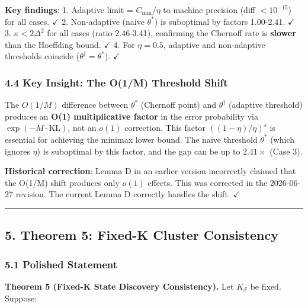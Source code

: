 \documentclass[
  12pt,
]{ctexart}
\begin{document}
\textbf{Key findings}: 1. Adaptive limit = \(C_{\min}/\eta\) to machine
precision (diff \(< 10^{-15}\)) for all cases. \(\checkmark\) 2.
Non-adaptive (naive \(\theta^*\)) is suboptimal by factors 1.00-2.41.
\(\checkmark\) 3. \(\kappa < 2\Delta^2\) for all cases (ratio
2.46-3.41), confirming the Chernoff rate is \textbf{slower} than the
Hoeffding bound. \(\checkmark\) 4. For \(\eta=0.5\), adaptive and
non-adaptive thresholds coincide (\(\theta^\dagger = \theta^*\)).
\(\checkmark\)

\subsubsection{4.4 Key Insight: The O(1/M) Threshold
Shift}\label{key-insight-the-o1m-threshold-shift}

The \(O(1/M)\) difference between \(\theta^*\) (Chernoff point) and
\(\theta^\dagger\) (adaptive threshold) produces an \textbf{O(1)
multiplicative factor} in the error probability via
\(\exp(-M\cdot\text{KL})\), not an \(o(1)\) correction. This factor
\(((1-\eta)/\eta)^s\) is essential for achieving the minimax lower
bound. The naive threshold \(\theta^*\) (which ignores \(\eta\)) is
suboptimal by this factor, and the gap can be up to \(2.41\times\) (Case
3).

\textbf{Historical correction}: Lemma D in an earlier version
incorrectly claimed that the O(1/M) shift produces only \(o(1)\)
effects. This was corrected in the 2026-06-27 revision. The current
Lemma D correctly handles the shift. \(\checkmark\)

\begin{center}\rule{0.5\linewidth}{0.5pt}\end{center}

\subsection{5. Theorem 5: Fixed-K Cluster
Consistency}\label{theorem-5-fixed-k-cluster-consistency}

\subsubsection{5.1 Polished Statement}\label{polished-statement-4}

\textbf{Theorem 5 (Fixed-K State Discovery Consistency).} Let
\(K_{\mathcal{S}}\) be fixed. Suppose:
\end{document}
